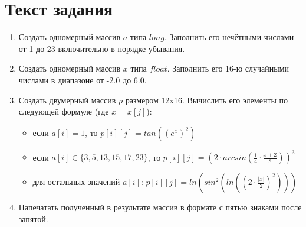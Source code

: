 \documentclass[11pt]{article}
\begin{document}
\section{Текст задания}
\begin{enumerate}
    \item Создать одномерный массив $a$ типа $long$. Заполнить его нечётными числами от 1 до 23 включительно в порядке убывания. 
    \item Создать одномерный массив $x$ типа $float$. Заполнить его 16-ю случайными числами в диапазоне от -2.0 до 6.0. 
    \item Создать двумерный массив $p$ размером 12x16. Вычислить его элементы по следующей формуле (где \begin{math}x = x[j]\end{math}):
        \begin{itemize}
            \item если $a[i] = 1$, то $p[i][j] = tan((e^x)^2)$
            \item если  $a[i] \in \{3, 5, 13, 15, 17, 23\}$, то $p[i][j] = (2 \cdot arcsin(\frac{1}{4} \cdot \frac{x+2}{8}))^3$
            \item для остальных значений $a[i]$: $p[i][j] = ln(sin ^2(ln((2 \cdot \frac{|x|}{2})^2)))$
        \end{itemize}
    \item Напечатать полученный в результате массив в формате с пятью знаками после запятой. 
\end{enumerate}
\pagebreak{}
\end{document}
